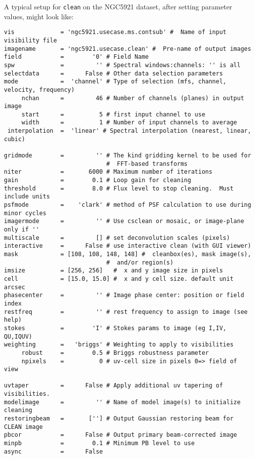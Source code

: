 A typical setup for {\tt clean} on the NGC5921 dataset, 
after setting parameter values, might look like:
\small
\begin{verbatim}
vis             = 'ngc5921.usecase.ms.contsub' #  Name of input visibility file
imagename       = 'ngc5921.usecase.clean' #  Pre-name of output images
field           =        '0' # Field Name
spw             =         '' # Spectral windows:channels: '' is all
selectdata      =      False # Other data selection parameters
mode            =  'channel' # Type of selection (mfs, channel, velocity, frequency)
     nchan      =         46 # Number of channels (planes) in output image
     start      =          5 # first input channel to use
     width      =          1 # Number of input channels to average
 interpolation  =  'linear' # Spectral interpolation (nearest, linear, cubic)

gridmode        =         '' # The kind gridding kernel to be used for
                             #  FFT-based transforms
niter           =       6000 # Maximum number of iterations
gain            =        0.1 # Loop gain for cleaning
threshold       =        8.0 # Flux level to stop cleaning.  Must include units
psfmode         =    'clark' # method of PSF calculation to use during minor cycles
imagermode      =         '' # Use csclean or mosaic, or image-plane only if ''
multiscale      =         [] # set deconvolution scales (pixels)
interactive     =      False # use interactive clean (with GUI viewer)
mask            = [108, 108, 148, 148] #  cleanbox(es), mask image(s),
                             #  and/or region(s)
imsize          = [256, 256]   #  x and y image size in pixels
cell            = [15.0, 15.0] #  x and y cell size. default unit arcsec
phasecenter     =         '' # Image phase center: position or field index
restfreq        =         '' # rest frequency to assign to image (see help)
stokes          =        'I' # Stokes params to image (eg I,IV, QU,IQUV)
weighting       =   'briggs' # Weighting to apply to visibilities
     robust     =        0.5 # Briggs robustness parameter
     npixels    =          0 # uv-cell size in pixels 0=> field of view

uvtaper         =      False # Apply additional uv tapering of  visibilities.
modelimage      =         '' # Name of model image(s) to initialize cleaning
restoringbeam   =       [''] # Output Gaussian restoring beam for CLEAN image
pbcor           =      False # Output primary beam-corrected image
minpb           =        0.1 # Minimum PB level to use
async           =      False        
\end{verbatim}
\normalsize


